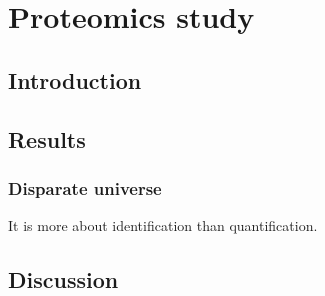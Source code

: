 \chapter{Proteomics study}
\label{ch:proteomics}

\section{Introduction}

\section{Results}
    \subsection{Disparate universe}
    It is more about identification than quantification.
\section{Discussion}


